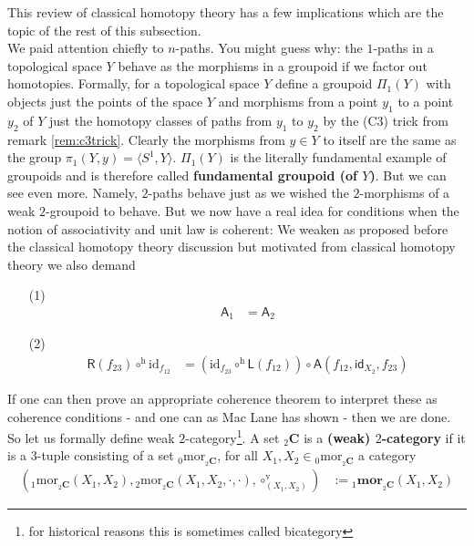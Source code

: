 This review of classical homotopy theory has a few implications which are the topic of the rest of this subsection.
\\
We paid attention chiefly to $n$-paths. You might guess why: the $1$-paths in a topological space $Y$ behave as the morphisms in a groupoid if we factor out homotopies. Formally, for a topological space $Y$ define a groupoid $\Pi_{1}(Y)$ with objects just the points of the space $Y$ and morphisms from a point $y_{1}$ to a point $y_{2}$ of $Y$ just the homotopy classes of paths from $y_{1}$ to $y_{2}$ by the (C3) trick from remark \ref{rem:c3trick}. Clearly the morphisms from $y \in Y$ to itself are the same as the group $\pi_{1}(Y,y) = \langle S^{1},Y \rangle$. $\Pi_{1}(Y)$ is the literally fundamental example of groupoids and is therefore called \textbf{fundamental groupoid (of $Y$)}. But we can see even more. Namely, $2$-paths behave just as we wished the $2$-morphisms of a weak $2$-groupoid to behave. But we now have a real idea for conditions when the notion of associativity and unit law is {\glqq}coherent{\grqq}: We weaken as proposed before the classical homotopy theory discussion but motivated from classical homotopy theory we also demand
\begin{enumerate}
\item[(1)]
\begin{align*}
  \mathsf{A}_{1}
  &=
  \mathsf{A}_{2}
\end{align*}
\item[(2)]
\begin{align*}
  \mathsf{R}(f_{23})
  \circ^{\textrm{h}}
  \mathrm{id}_{f_{12}}
  &=
  \left(
    \mathrm{id}_{f_{23}}
    \circ^{\textrm{h}}
    \mathsf{L}(f_{12})
  \right)
  \circ
  \mathsf{A}(f_{12},\mathsf{id}_{X_{2}},f_{23})
\end{align*}
\end{enumerate}
If one can then prove an appropriate coherence theorem to interpret these as coherence conditions - and one can as Mac Lane has shown - then we are done. So let us formally define weak $2$-category\footnote{for historical reasons this is sometimes called bicategory}. A set ${}_{2}\mathbf{C}$ is a \textbf{(weak) $2$-category} if it is a $3$-tuple consisting of a set ${}_{0}\mathrm{mor}_{{}_{2}\mathbf{C}}$, for all $X_{1},X_{2} \in {}_{0}\mathrm{mor}_{_{2}\mathbf{C}}$ a category
\begin{align*}
  \left(
    {}_{1}\mathrm{mor}_{{}_{2}\mathbf{C}}(X_{1},X_{2}),
    {}_{2}\mathrm{mor}_{{}_{2}\mathbf{C}}(X_{1},X_{2},\cdot,\cdot),
    \circ_{(X_{1},X_{2})}^{\textrm{v}}
  \right)
  &:=
  {}_{1}\mathbf{mor}_{{}_{2}\mathbf{C}}(X_{1},X_{2})
\end{align*}
